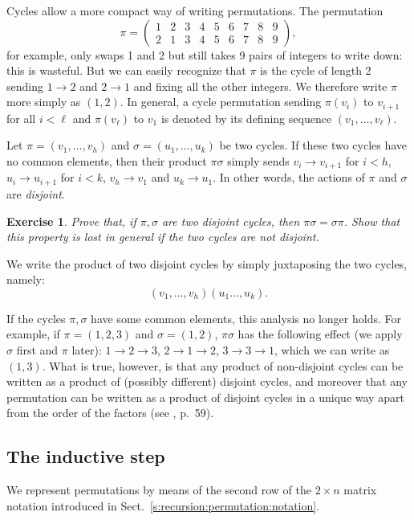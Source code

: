 \documentclass[a4paper]{book}
\theoremstyle{changebreak}                %
\newtheorem{ex}[result]{Exercise}
\begin{document}
Cycles allow a more compact way of writing permutations. The
permutation
\begin{equation*}
  \pi=\left(
  \begin{array}{ccccccccc} 1 & 2 & 3 & 4 & 5 & 6 & 7 & 8 & 9\\ 
                           2 & 1 & 3 & 4 & 5 & 6 & 7 & 8 & 9
  \end{array}\right),
\end{equation*}
for example, only swaps 1 and 2 but still takes 9 pairs of
integers to write down: this is wasteful. But we can easily recognize
that $\pi$ is the cycle of length 2 sending $1\to
2$ and $2\to 1$ and fixing all the other integers. We therefore write
$\pi$ more simply as $(1,2)$. In general, a cycle permutation sending
$\pi(v_i)$ to $v_{i+1}$ for all $i<\ell$ and $\pi(v_\ell)$ to $v_1$ is
denoted by its defining sequence $(v_1,\ldots,v_\ell)$.

Let $\pi=(v_1,\ldots,v_h)$ and $\sigma=(u_1,\ldots,u_k)$ be two
cycles. If these two cycles have no common elements, then their
product $\pi\sigma$ simply sends $v_i\to v_{i+1}$ for $i<h$, $u_i\to
u_{i+1}$ for $i<k$, $v_h\to v_1$ and $u_k\to u_1$. In other words, the
actions of $\pi$ and $\sigma$ are {\it
  disjoint}. 
\begin{ex}
Prove that, if $\pi,\sigma$ are two disjoint cycles, then 
$\pi\sigma=\sigma\pi$. Show that this property is lost in general if
the two cycles are not disjoint.
\end{ex}
We write the product of two disjoint cycles by simply juxtaposing the
two cycles, namely:
\begin{equation*}
  (v_1,\ldots,v_h)(u_1\ldots,u_k).
\end{equation*}

If the cycles $\pi,\sigma$ have some common elements, this analysis no
longer holds. For example, if $\pi=(1,2,3)$ and $\sigma=(1,2)$,
$\pi\sigma$ has the following effect (we apply $\sigma$ first and
$\pi$ later): $1\to 2\to 3$, $2\to 1\to 2$, $3\to 3\to 1$, which we
can write as $(1,3)$. What is true, however, is that any product of
non-disjoint cycles can be written as a product of (possibly
different) disjoint cycles, and moreover that any permutation can be
written as a product of disjoint cycles in a unique way apart from the
order of the factors (see \cite{clark}, p.~59).

\subsection{The inductive step}
We represent permutations by means of the second row of the $2\times
n$ matrix notation introduced in
Sect.~\ref{s:recursion:permutation:notation}.
\end{document}
